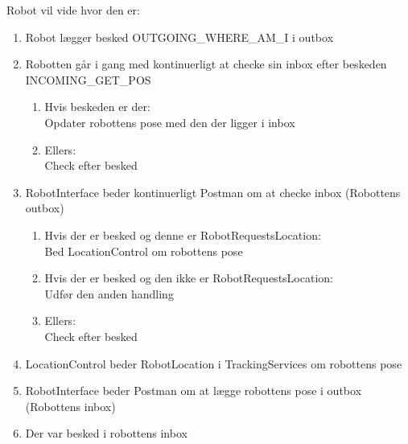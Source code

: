 
Robot vil vide hvor den er:
\begin{enumerate}
\item Robot lægger besked OUTGOING\_WHERE\_AM\_I i outbox
\item Robotten går i gang med kontinuerligt at checke sin inbox efter beskeden INCOMING\_GET\_POS
\begin{enumerate}
\item Hvis beskeden er der:\\
Opdater robottens pose med den der ligger i inbox
\item Ellers:\\
Check efter besked
\end{enumerate}
\item RobotInterface beder kontinuerligt Postman om at checke inbox (Robottens outbox)
\begin{enumerate}
\item Hvis der er besked og denne er RobotRequestsLocation:\\
Bed LocationControl om robottens pose
\item Hvis der er besked og den ikke er RobotRequestsLocation:\\
Udfør den anden handling
\item Ellers:\\
Check efter besked
\end{enumerate}
\item LocationControl beder RobotLocation i TrackingServices om robottens pose
\item RobotInterface beder Postman om at lægge robottens pose i outbox (Robottens inbox)
\item Der var besked i robottens inbox
\end{enumerate}